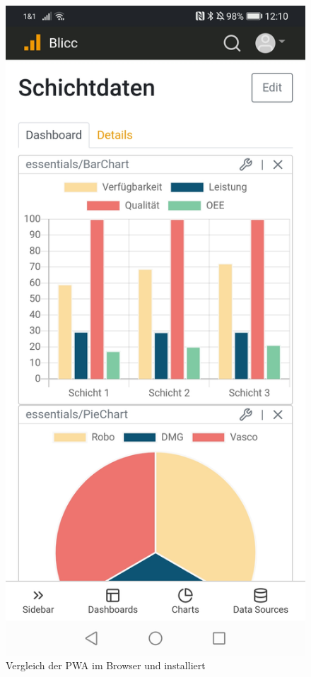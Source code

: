 \begin{figure}[h]
    \includegraphics[scale=0.15]{img/android/Installed}
    \caption{Vergleich der PWA im Browser und installiert}
    \label{figure:vergleichderpwaimbrowserundinstalliert}
\end{figure}

